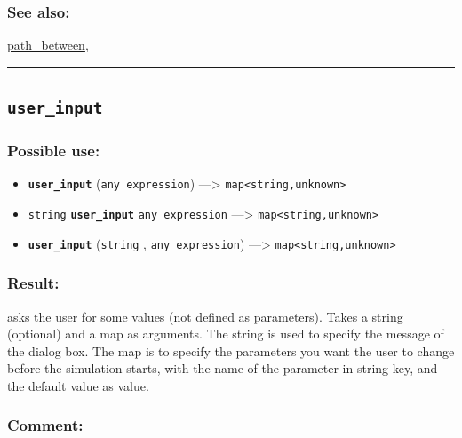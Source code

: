 \documentclass[]{book}
\providecommand{\tightlist}{%
  \setlength{\itemsep}{0pt}\setlength{\parskip}{0pt}}
\theoremstyle{definition}
\theoremstyle{definition}
\theoremstyle{definition}
\theoremstyle{remark}
\begin{document}
\subsubsection{See also:}\label{see-also-216}

\href{operators-n-to-r.html\#path_between}{path\_between},

\begin{center}\rule{0.5\linewidth}{\linethickness}\end{center}

\subsection{\texorpdfstring{\texttt{user\_input}}{user\_input}}\label{user_input}

\subsubsection{Possible use:}\label{possible-use-546}

\begin{itemize}
\tightlist
\item
  \textbf{\texttt{user\_input}} (\texttt{any\ expression})
  ---\textgreater{} \texttt{map\textless{}string,unknown\textgreater{}}
\item
  \texttt{string} \textbf{\texttt{user\_input}} \texttt{any\ expression}
  ---\textgreater{} \texttt{map\textless{}string,unknown\textgreater{}}
\item
  \textbf{\texttt{user\_input}} (\texttt{string} ,
  \texttt{any\ expression}) ---\textgreater{}
  \texttt{map\textless{}string,unknown\textgreater{}}
\end{itemize}

\subsubsection{Result:}\label{result-526}

asks the user for some values (not defined as parameters). Takes a
string (optional) and a map as arguments. The string is used to specify
the message of the dialog box. The map is to specify the parameters you
want the user to change before the simulation starts, with the name of
the parameter in string key, and the default value as value.

\subsubsection{Comment:}\label{comment-104}
\end{document}
